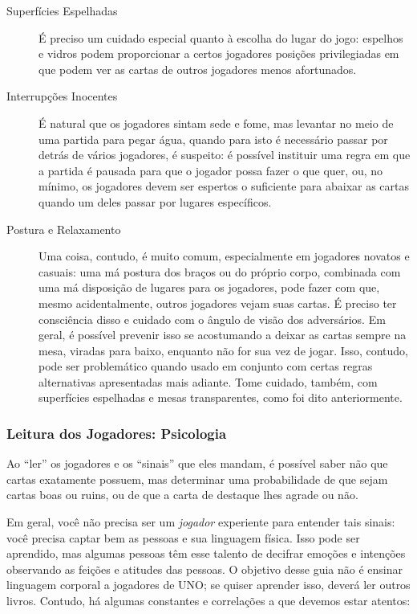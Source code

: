 \begin{description}
\item[Superfícies Espelhadas]{É preciso um cuidado especial quanto à escolha do lugar do jogo: espelhos e vidros podem proporcionar a certos jogadores posições privilegiadas em que podem ver as cartas de outros jogadores menos afortunados.}
\item[Interrupções Inocentes]{É natural que os jogadores sintam sede e fome, mas levantar no meio de uma partida para pegar água, quando para isto é necessário passar por detrás de vários jogadores, é suspeito: é possível instituir uma regra em que a partida é pausada para que o jogador possa fazer o que quer, ou, no mínimo, os jogadores devem ser espertos o suficiente para abaixar as cartas quando um deles passar por lugares específicos.}
\item[Postura e Relaxamento]{Uma coisa, contudo, é muito comum, especialmente em jogadores novatos e casuais: uma má postura dos braços ou do próprio corpo, combinada com uma má disposição de lugares para os jogadores, pode fazer com que, mesmo acidentalmente, outros jogadores vejam suas cartas. É preciso ter consciência disso e cuidado com o ângulo de visão dos adversários. Em geral, é possível prevenir isso se acostumando a deixar as cartas sempre na mesa, viradas para baixo, enquanto não for sua vez de jogar. Isso, contudo, pode ser problemático quando usado em conjunto com certas regras alternativas apresentadas mais adiante. Tome cuidado, também, com superfícies espelhadas e mesas transparentes, como foi dito anteriormente.}
\end{description}

\subsubsection{Leitura dos Jogadores: Psicologia}

Ao ``ler'' os jogadores e os ``sinais'' que eles mandam, é possível saber não que cartas exatamente possuem, mas determinar uma probabilidade de que sejam cartas boas ou ruins, ou de que a carta de destaque lhes agrade ou não.

Em geral, você não precisa ser um \textit{jogador} experiente para entender tais sinais: você precisa captar bem as pessoas e sua linguagem física. Isso pode ser aprendido, mas algumas pessoas têm esse talento de decifrar emoções e intenções observando as feições e atitudes das pessoas. O objetivo desse guia não é ensinar linguagem corporal a jogadores de UNO; se quiser aprender isso, deverá ler outros livros. Contudo, há algumas constantes e correlações a que devemos estar atentos:

